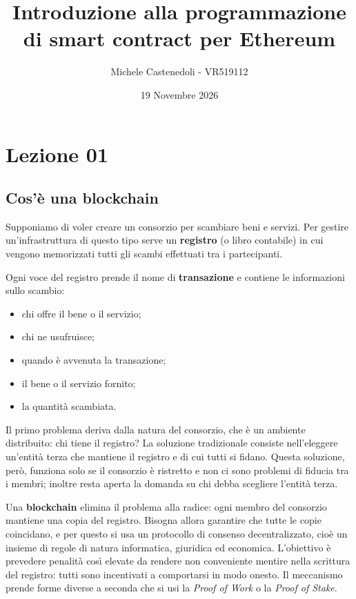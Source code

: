 \documentclass[a4paper, 11pt, oneside]{book}
\title{Introduzione alla programmazione di smart contract per Ethereum}
\author{Michele Castenedoli - VR519112}
\date{19 Novembre 2026}
\begin{document}
	\frontmatter
	\maketitle
	\tableofcontents

	\mainmatter
	\chapter{Lezione 01}
	\section{Cos'è una blockchain}
	Supponiamo di voler creare un consorzio per scambiare beni e servizi. Per gestire
	un'infrastruttura di questo tipo serve un \textbf{registro} (o libro contabile) in
	cui vengono memorizzati tutti gli scambi effettuati tra i partecipanti.

	Ogni voce del registro prende il nome di \textbf{transazione} e contiene le
	informazioni sullo scambio:
	\begin{itemize}
		\item chi offre il bene o il servizio;
		\item chi ne usufruisce;
		\item quando è avvenuta la transazione;
		\item il bene o il servizio fornito;
		\item la quantità scambiata.
	\end{itemize}

	Il primo problema deriva dalla natura del consorzio, che è un ambiente distribuito:
	chi tiene il registro? La soluzione tradizionale consiste nell'eleggere un'entità
	terza che mantiene il registro e di cui tutti si fidano. Questa soluzione, però,
	funziona solo se il consorzio è ristretto e non ci sono problemi di fiducia tra i
	membri; inoltre resta aperta la domanda su chi debba scegliere l'entità terza.

	Una \textbf{blockchain} elimina il problema alla radice: ogni membro del consorzio
	mantiene una copia del registro. Bisogna allora garantire che tutte le copie
	coincidano, e per questo si usa un protocollo di consenso decentralizzato, cioè un
	insieme di regole di natura informatica, giuridica ed economica. L'obiettivo è
	prevedere penalità così elevate da rendere non conveniente mentire nella scrittura
	del registro: tutti sono incentivati a comportarsi in modo onesto. Il meccanismo
	prende forme diverse a seconda che si usi la \textit{Proof of Work} o la
	\textit{Proof of Stake}.
\end{document}
